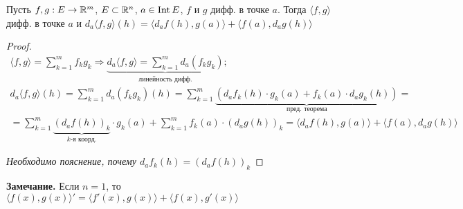 \begin{theorem}
    Пусть $f, g : E \to \mathbb{R}^m$, $E \subset \mathbb{R}^n$, $a \in \operatorname{Int} E$,
    $f$ и $g$ дифф. в точке $a$. Тогда $\langle f, g \rangle$
    дифф. в точке $a$ и $d_a \langle f, g \rangle (h) =
    \langle d_a f(h), g(a) \rangle + \langle f(a), d_a g(h) \rangle$
\end{theorem}
\begin{proof}
    \begin{gather*}
        \langle f, g \rangle = \sum_{k = 1}^m f_k g_k
        \Rightarrow 
        \underbrace{d_a \langle f, g \rangle = 
        \sum_{k = 1}^m d_a (f_k g_k)}
        _\text{линейность дифф.}; \\
        d_a \langle f, g \rangle (h) = 
        \sum_{k = 1}^m d_a (f_k g_k)(h) =
        \sum_{k = 1}^m 
        \underbrace{(d_a f_k (h) \cdot g_k(a) + 
        f_k (a) \cdot d_a g_k(h))}_{\text{пред. теорема}} = \\
        = \sum_{k = 1}^m 
        \underbrace{(d_a f(h))_k}_{\text{$k$-я коорд.}}
        \cdot g_k(a) + 
        \sum_{k = 1}^m f_k (a) \cdot (d_a g(h))_k =
        \langle d_a f(h), g(a) \rangle + \langle f(a), d_a g(h) \rangle
    \end{gather*}

    \textit{Необходимо пояснение, почему $d_a f_k (h) = (d_a f(h))_k$}
\end{proof}
\textbf{Замечание.} Если $n = 1$, то $\langle f(x), g(x) \rangle' =
\langle f'(x), g(x) \rangle + \langle f(x), g'(x) \rangle$

